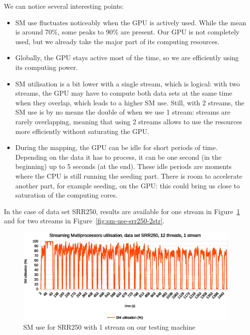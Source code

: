 We can notice several interesting points:
\begin{itemize}
    \item SM use fluctuates noticeably when the GPU is actively used. While the mean is around 70\%, some peaks to 90\% are present. Our GPU is not completely used, but we already take the major part of its computing resources.
    \item Globally, the GPU stays active most of the time, so we are efficiently using its computing power.
    \item SM utilisation is a bit lower with a single stream, which is logical: with two streams, the GPU may have to compute both data sets at the same time when they overlap, which leads to a higher SM use. Still, with 2 streams, the SM use is by no means the double of when we use 1 stream: streams are rarely overlapping, meaning that using 2 streams allows to use the resources more efficiently without saturating the GPU.
    \item During the mapping, the GPU can be idle for short periods of time. Depending on the data it has to process, it can be one second (in the beginning) up to 5 seconds (at the end). These idle periods are moments where the CPU is still running the seeding part. There is room to accelerate another part, for example seeding, on the GPU: this could bring us close to saturation of the computing cores.
\end{itemize}{}

In the case of data set SRR250, results are available for one stream in Figure~\ref{fig:sm-use-srr250-1str} and for two streams in Figure~\ref{fig:sm-use-srr250-2str}.

\begin{figure}[h]
	\centering
	\includegraphics[width=0.9\linewidth]{SM_utilisation_12threads1stream_SRR250}
	\caption{SM use for SRR250 with 1 stream on our testing machine}
	\label{fig:sm-use-srr250-1str}
\end{figure}

